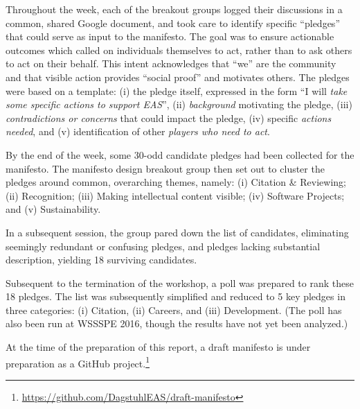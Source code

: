 \documentclass[a4paper,UKenglish]{dagrep}
\begin{document}
Throughout the week, each of the breakout groups logged their discussions in a common, shared Google document, and took care to identify specific ``pledges'' that could serve as input to the manifesto. The goal was to ensure actionable outcomes which called on individuals themselves to act, rather than to ask others to act on their behalf. This intent acknowledges that ``we'' are the community and that visible action provides ``social proof'' and motivates others. The pledges were based on a template: (i) the pledge itself, expressed in the form ``I will \emph{take some specific actions to support EAS}'', (ii) \emph{background} motivating the pledge, (iii) \emph{contradictions or concerns} that could impact the pledge, (iv) specific \emph{actions needed}, and (v) identification of other \emph{players who need to act}.

By the end of the week, some 30-odd candidate pledges had been collected for the manifesto.
The manifesto design breakout group then set out to cluster the pledges around common, overarching themes, namely:
(i) Citation \& Reviewing;
(ii) Recognition;
(iii) Making intellectual content visible;
(iv) Software Projects; and
(v) Sustainability.

In a subsequent session, the group pared down the list of candidates, eliminating seemingly redundant or confusing pledges, and pledges lacking substantial description, yielding 18 surviving candidates.

Subsequent to the termination of the workshop, a poll was prepared to rank these 18 pledges. The list was subsequently simplified and reduced to 5 key pledges in three categories: (i) Citation, (ii) Careers, and (iii) Development.
(The poll has also been run at WSSSPE 2016, though the results have not yet been analyzed.)

At the time of the preparation of this report, a draft manifesto is under preparation as a GitHub project.\footnote{\url{https://github.com/DagstuhlEAS/draft-manifesto}}


%


\end{document}
